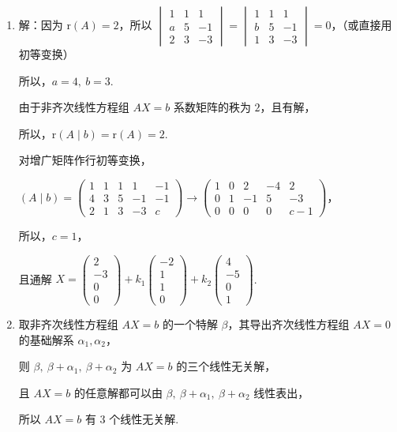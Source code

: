 \documentclass[a4paper,11pt]{ctexart}
\newcommand{\rk}{\mathrm{r}}
\newcommand{\score}[1]{\hfill\text{#1 分}}
\begin{document}
\begin{enumerate}[label=(\arabic*), leftmargin=2.4em, itemsep=0.35em, topsep=0.3em]
  \item 解：因为 $\rk(A) = 2$，所以 $\begin{vmatrix} 1 & 1 & 1 \\ a & 5 & -1 \\ 2 & 3 & -3 \end{vmatrix} = \begin{vmatrix} 1 & 1 & 1 \\ b & 5 & -1 \\ 1 & 3 & -3 \end{vmatrix} = 0$，（或直接用初等变换）

  所以，$a = 4,\ b = 3$. \score{4}

  由于非齐次线性方程组 $AX = b$ 系数矩阵的秩为 $2$，且有解，

  所以，$\rk(A \mid b) = \rk(A) = 2$.

  对增广矩阵作行初等变换，

  $(A \mid b) = \left(\begin{array}{cccc|c} 1 & 1 & 1 & 1 & -1 \\ 4 & 3 & 5 & -1 & -1 \\ 2 & 1 & 3 & -3 & c \end{array}\right) \to \left(\begin{array}{cccc|c} 1 & 0 & 2 & -4 & 2 \\ 0 & 1 & -1 & 5 & -3 \\ 0 & 0 & 0 & 0 & c - 1 \end{array}\right)$，

  所以，$c = 1$， \score{6}

  且通解 $X = \begin{pmatrix} 2 \\ -3 \\ 0 \\ 0 \end{pmatrix} + k_1\begin{pmatrix} -2 \\ 1 \\ 1 \\ 0 \end{pmatrix} + k_2\begin{pmatrix} 4 \\ -5 \\ 0 \\ 1 \end{pmatrix}$. \score{8}

  \item 取非齐次线性方程组 $AX = b$ 的一个特解 $\beta$，其导出齐次线性方程组 $AX = 0$ 的基础解系 $\alpha_1, \alpha_2$，

  则 $\beta,\ \beta + \alpha_1,\ \beta + \alpha_2$ 为 $AX = b$ 的三个线性无关解， \score{2}

  且 $AX = b$ 的任意解都可以由 $\beta,\ \beta + \alpha_1,\ \beta + \alpha_2$ 线性表出，

  所以 $AX = b$ 有 $3$ 个线性无关解. \score{4}
\end{enumerate}
\end{document}
